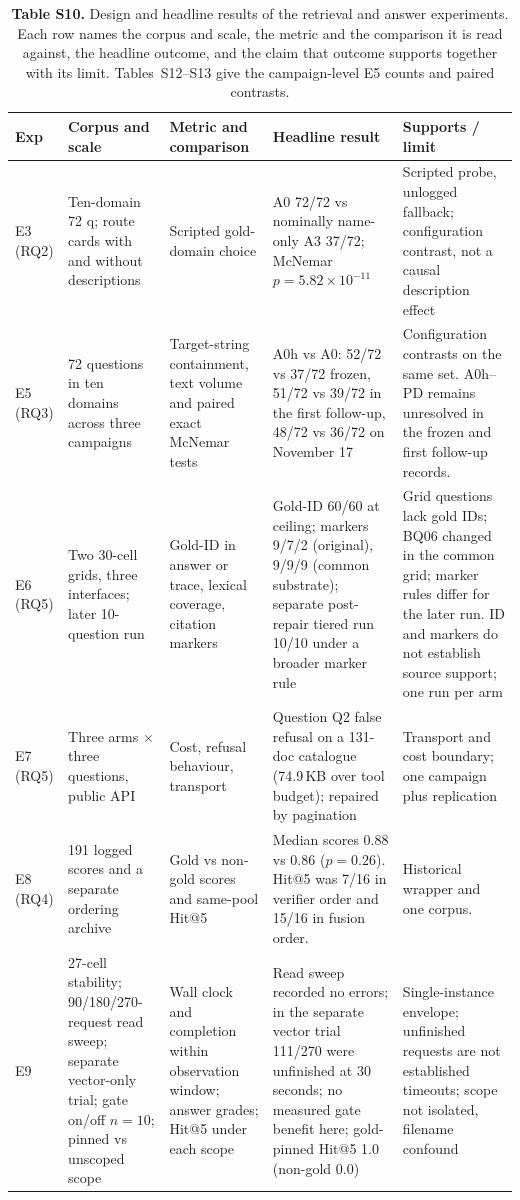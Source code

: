 \begin{table}
\centering
\footnotesize
\setlength{\tabcolsep}{4pt}
\caption{\textbf{Table S10.} Design and headline results of the retrieval and answer experiments.
Each row names the corpus and scale, the metric and the comparison it is read
against, the headline outcome, and the claim that outcome supports together
with its limit. Tables~S12--S13 give the campaign-level E5 counts and paired
contrasts.}

\begin{tabular}{@{}p{1.650cm}p{3.300cm}p{3.960cm}p{3.960cm}p{2.145cm}@{}}
\toprule
Exp & Corpus and scale & Metric and comparison & Headline result & Supports / limit\\
\midrule
E3 (RQ2) & Ten-domain 72 q; route cards with and without descriptions & Scripted gold-domain choice & A0 72/72 vs nominally name-only A3 37/72; McNemar $p=5.82\times10^{-11}$ & Scripted probe, unlogged fallback; configuration contrast, not a causal description effect\\
E5 (RQ3) & 72 questions in ten domains across three campaigns & Target-string containment, text volume and paired exact McNemar tests & A0h vs A0: 52/72 vs 37/72 frozen, 51/72 vs 39/72 in the first follow-up, 48/72 vs 36/72 on November 17 & Configuration contrasts on the same set. A0h--PD remains unresolved in the frozen and first follow-up records.\\
E6 (RQ5) & Two 30-cell grids, three interfaces; later 10-question run & Gold-ID in answer or trace, lexical coverage, citation markers & Gold-ID 60/60 at ceiling; markers 9/7/2 (original), 9/9/9 (common substrate); separate post-repair tiered run 10/10 under a broader marker rule & Grid questions lack gold IDs; BQ06 changed in the common grid; marker rules differ for the later run. ID and markers do not establish source support; one run per arm\\
E7 (RQ5) & Three arms $\times$ three questions, public API & Cost, refusal behaviour, transport & Question Q2 false refusal on a 131-doc catalogue (74.9\,KB over tool budget); repaired by pagination & Transport and cost boundary; one campaign plus replication\\
E8 (RQ4) & 191 logged scores and a separate ordering archive & Gold vs non-gold scores and same-pool Hit@5 & Median scores 0.88 vs 0.86 ($p=0.26$). Hit@5 was 7/16 in verifier order and 15/16 in fusion order. & Historical wrapper and one corpus.\\
E9 & 27-cell stability; 90/180/270-request read sweep; separate vector-only trial; gate on/off $n=10$; pinned vs unscoped scope & Wall clock and completion within observation window; answer grades; Hit@5 under each scope & Read sweep recorded no errors; in the separate vector trial 111/270 were unfinished at 30 seconds; no measured gate benefit here; gold-pinned Hit@5 1.0 (non-gold 0.0) & Single-instance envelope; unfinished requests are not established timeouts; scope not isolated, filename confound\\
\bottomrule
\end{tabular}
\end{table}
